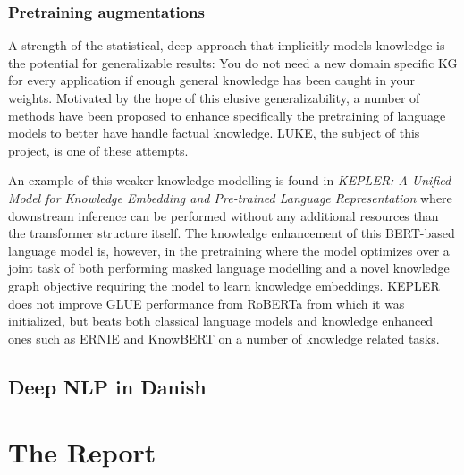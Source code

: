 \documentclass[main.tex]{subfiles}
\begin{document}
\subsubsection{Pretraining augmentations}
A strength of the statistical, deep approach that implicitly models knowledge is the potential for generalizable results:
You do not need a new domain specific KG for every application if enough general knowledge has been caught in your weights.
Motivated by the hope of this elusive generalizability, a number of methods have been proposed to enhance specifically the pretraining of language models to better have handle factual knowledge.
LUKE, the subject of this project, is one of these attempts.

An example of this weaker knowledge modelling is found in \emph{KEPLER: A Unified Model for Knowledge Embedding and Pre-trained Language Representation} \cite{wang2021kepler} where downstream inference can be performed without any additional resources than the transformer structure itself.
The knowledge enhancement of this BERT-based language model is, however, in the pretraining where the model optimizes over a joint task of both performing masked language modelling and a novel knowledge graph objective requiring the model to learn knowledge embeddings.
KEPLER does not improve GLUE performance from RoBERTa \cite{liu2019roberta} from which it was initialized, but beats both classical language models and knowledge enhanced ones such as ERNIE and KnowBERT on a number of knowledge related tasks.

\subsection{Deep NLP in Danish}
%
%

\section{The Report}%
\label{sec:The Report}
\end{document}
